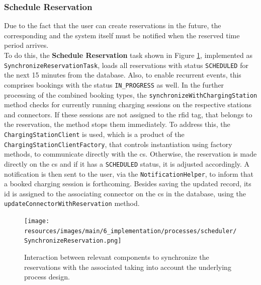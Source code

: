\newpage

\subsubsection{Schedule Reservation}
\label{ch:Implementation:sec:Reservation System:ssec:Scheduling Capabilities:sssec:Schedule Reservation}

Due to the fact that the user can create reservations in the future, the corresponding  and the system itself must be notified when the reserved time period arrives. \\
To do this, the \textbf{Schedule Reservation} task shown in Figure \ref{fig:schedule-reservation-seqflow}, implemented as \\ \texttt{SynchronizeReservationTask}, loads all reservations with status \texttt{SCHEDULED} for the next 15 minutes from the database.
Also, to enable recurrent events, this comprises bookings with the status \texttt{IN\_PROGRESS} as well. 
In the further processing of the combined booking types, the \texttt{synchronizeWithChargingStation} method checks for currently running charging sessions on the respective stations and connectors. If these sessions are not assigned to the \acrshort{rfid} tag, that belongs to the reservation, the method stops them immediately.
To address this, the \texttt{ChargingStationClient} is used, which is a product of the \texttt{ChargingStationClientFactory}, that controls instantiation using factory methods, to communicate directly with the \acrshort{cs}.
Otherwise, the reservation is made directly on the \acrshort{cs} and if it has a \texttt{SCHEDULED} status, it is adjusted accordingly. A notification is then sent to the user, via the \texttt{NotificationHelper}, to inform that a booked charging session is forthcoming.
Besides saving the updated record, its \acrshort{id} is assigned to the associating connector on the \acrshort{cs} in the database, using the \texttt{updateConnectorWithReservation} method.

\begin{figure}[h]
    \centering
    \texttt{[image: resources/images/main/6\_implementation/processes/scheduler/SynchronizeReservation.png]}
    \caption{Interaction between relevant components to synchronize the reservations with the associated  taking into account the underlying process design.}
    \label{fig:schedule-reservation-seqflow}
\end{figure}

\newpage

